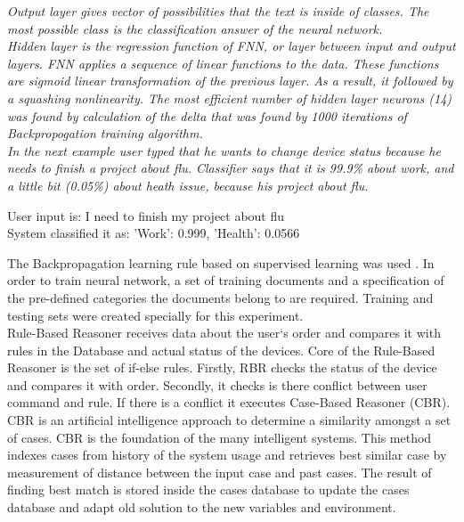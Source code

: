 \documentclass{llncs}
\begin{document}
    \em Output layer \em gives vector of possibilities that the text is inside of classes.
    The most possible class is the classification answer of the neural network.\\
    \em Hidden layer \em is the regression function of FNN, or layer between input and output layers.
    FNN applies a sequence of linear functions to the data.
    These functions are sigmoid linear transformation of the previous layer.
    As a result, it followed by a squashing nonlinearity.
    The most efficient number of hidden layer neurons (14) was found by calculation of the delta that was found by
    1000 iterations of Backpropogation training algorithm.\\
    In the next example user typed that he wants to change device status because he needs to finish a project about flu.
    Classifier says that it is 99.9\% about work, and a little bit (0.05\%) about heath issue, because his project about flu.\\
    \begin{example}
        User input is: I need to finish my project about flu\\
        System classified it as: 'Work': 0.999, 'Health': 0.0566
    \end{example}
    The Backpropagation learning rule based on supervised learning was used \cite{14}.
    In order to train neural network, a set of training documents and a specification of the pre-defined categories the
    documents belong to are required.
    Training and testing sets were created specially for this experiment.\\
    Rule-Based Reasoner receives data about the user`s order and compares it with rules in the Database and actual status of the devices.
    Core of the Rule-Based Reasoner is the set of if-else rules.
    Firstly, RBR checks the status of the device and compares it with order.
    Secondly, it checks is there conflict between user command and rule.
    If there is a conflict it executes Case-Based Reasoner (CBR).\\
    CBR is an artificial intelligence approach to determine a similarity amongst a set of cases.
    CBR is the foundation of the many intelligent systems.
    This method indexes cases from history of the system usage and retrieves best similar case by measurement of distance between the input case and past cases.
    The result of finding best match is stored inside the cases database to update the cases database and adapt old solution to the new variables and environment.
\end{document}
